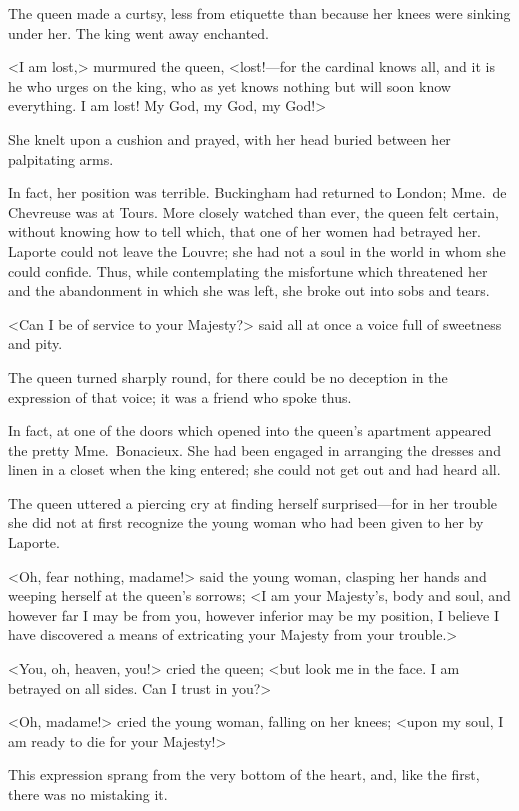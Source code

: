 The queen made a curtsy, less from etiquette than because her knees were sinking under her. The king went away enchanted. 

<I am lost,> murmured the queen, <lost!—for the cardinal knows all, and it is he who urges on the king, who as yet knows nothing but will soon know everything. I am lost! My God, my God, my God!> 

She knelt upon a cushion and prayed, with her head buried between her palpitating arms. 

In fact, her position was terrible. Buckingham had returned to London; Mme.~de Chevreuse was at Tours. More closely watched than ever, the queen felt certain, without knowing how to tell which, that one of her women had betrayed her. Laporte could not leave the Louvre; she had not a soul in the world in whom she could confide. Thus, while contemplating the misfortune which threatened her and the abandonment in which she was left, she broke out into sobs and tears. 

<Can I be of service to your Majesty?> said all at once a voice full of sweetness and pity. 

The queen turned sharply round, for there could be no deception in the expression of that voice; it was a friend who spoke thus. 

In fact, at one of the doors which opened into the queen's apartment appeared the pretty Mme.~Bonacieux. She had been engaged in arranging the dresses and linen in a closet when the king entered; she could not get out and had heard all. 

The queen uttered a piercing cry at finding herself surprised—for in her trouble she did not at first recognize the young woman who had been given to her by Laporte. 

<Oh, fear nothing, madame!> said the young woman, clasping her hands and weeping herself at the queen's sorrows; <I am your Majesty's, body and soul, and however far I may be from you, however inferior may be my position, I believe I have discovered a means of extricating your Majesty from your trouble.> 

<You, oh, heaven, you!> cried the queen; <but look me in the face. I am betrayed on all sides. Can I trust in you?> 

<Oh, madame!> cried the young woman, falling on her knees; <upon my soul, I am ready to die for your Majesty!> 

This expression sprang from the very bottom of the heart, and, like the first, there was no mistaking it. 

